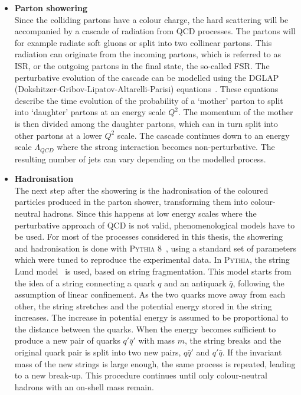 \begin{itemize}
 \item[] \textbf{Parton showering}\\
Since the colliding partons have a colour charge, the hard scattering will be accompanied by a cascade of radiation from \acs{QCD} processes. The partons will for example radiate soft gluons or split into two collinear partons. This radiation can originate from the incoming partons, which is referred to as \ac{ISR}, or the outgoing partons in the final state, the so-called \ac{FSR}. The perturbative evolution of the cascade can be modelled using the DGLAP (Dokshitzer-Gribov-Lipatov-Altarelli-Parisi) equations~\cite{Gribov:1972ri, Dokshitzer:1977sg, Altarelli:1977zs}. These equations describe the time evolution of the probability of a `mother' parton to split into `daughter' partons at an energy scale $Q^2$. The momentum of the mother is then divided among the daughter partons, which can in turn split into other partons at a lower $Q^2$ scale. The cascade continues down to an energy scale $\Lambda_{QCD}$ where the strong interaction becomes non-perturbative. The resulting number of jets can vary depending on the modelled process.
% 

\item[] \textbf{Hadronisation}\\
The next step after the showering is the hadronisation of the coloured particles produced in the parton shower, transforming them into colour-neutral hadrons. Since this happens at low energy scales where the perturbative approach of \acs{QCD} is not valid, phenomenological models have to be used. For most of the processes considered in this thesis, the showering and hadronisation is done with \textsc{Pythia 8}~\cite{Sjostrand:2006za}, using a standard set of parameters which were tuned to reproduce the experimental data. In \textsc{Pythia}, the string Lund model~\cite{Andersson:1983ia} is used, based on string fragmentation. This model starts from the idea of a string connecting a quark $q$ and an antiquark $\bar{q}$, following the assumption of linear confinement. As the two quarks move away from each other, the string stretches and the potential energy stored in the string increases. The increase in potential energy is assumed to be proportional to the distance between the quarks. When the energy becomes sufficient to produce a new pair of quarks $q'\bar{q}'$ with mass $m$, the string breaks and the original quark pair is split into two new pairs, $q\bar{q}'$ and $q'\bar{q}$. If the invariant mass of the new strings is large enough, the same process is repeated, leading to a new break-up. This procedure continues until only colour-neutral hadrons with an on-shell mass remain.


\end{itemize}
